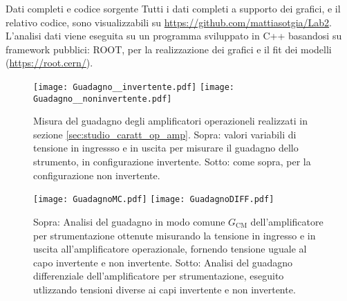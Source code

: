 \documentclass[
    rmp,
    reprint, 
    superscriptaddress, 
    altaffilletter, 
    amsmath, 
    amssymb,
    a4paper]{revtex4-2}
\begin{document}
\begin{methods}{D\lowercase{ati completi e codice sorgente}}
    Tutti i dati completi a supporto dei grafici, e il relativo codice, sono visualizzabili su \url{https://github.com/mattiasotgia/Lab2}. L'analisi dati viene eseguita su un programma sviluppato in C++ basandosi su framework pubblici: ROOT, per la realizzazione dei grafici e il fit dei modelli (\url{https://root.cern/}).
\end{methods}

\appendix

\renewcommand{\thetable}{S-\arabic{table}}
\renewcommand{\thefigure}{S-\arabic{figure}}
\begin{figure*}[p]
    \raggedright
    \texttt{[image: Guadagno\_\_invertente.pdf]}
    \texttt{[image: Guadagno\_\_noninvertente.pdf]}
    \caption{Misura del guadagno degli amplificatori operazioneli realizzati in sezione \ref{sec:studio_caratt_op_amp}. Sopra: valori variabili di tensione in ingressso e in uscita per misurare il guadagno dello strumento, in configurazione invertente. Sotto: come sopra, per la configurazione non invertente.}
    \label{fig:guadagno_inv_noninv}
\end{figure*}
\begin{figure*}
    \raggedright
    \texttt{[image: GuadagnoMC.pdf]}
    \texttt{[image: GuadagnoDIFF.pdf]}
    \caption{Sopra: Analisi del guadagno in modo comune $G_{\text{CM}}$ dell'amplificatore per strumentazione ottenute misurando la tensione in ingresso e in uscita all'amplificatore operazionale, fornendo tensione uguale al capo invertente e non invertente. Sotto: Analisi del guadagno differenziale dell'amplificatore per strumentazione, eseguito utlizzando tensioni diverse ai capi invertente e non invertente. }
    \label{fig:guadagno_op_amp_strum}
\end{figure*}
\end{document}

